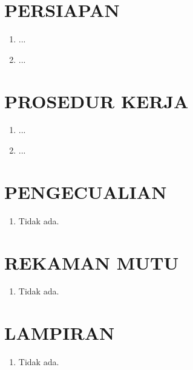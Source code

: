 \documentclass[12pt]{sop}
\begin{document}
    \section{PERSIAPAN}
    \begin{enumerate}
        \item ...
        \item ...
    \end{enumerate}

    \section{PROSEDUR KERJA}
    \begin{enumerate}
        \item ...
        \item ...
    \end{enumerate}

    \section{PENGECUALIAN}
    \begin{enumerate}
        \item Tidak ada.
    \end{enumerate}

    \section{REKAMAN MUTU}
    \begin{enumerate}
        \item Tidak ada.
    \end{enumerate}

    \section{LAMPIRAN}
    \begin{enumerate}
        \item Tidak ada.
    \end{enumerate}
\end{document}
